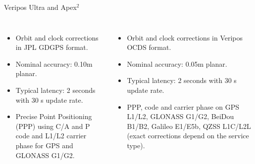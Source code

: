 \documentclass[11pt]{beamer}
\begin{document}
\begin{frame}{Veripos Ultra and Apex$^2$} %
	\begin{columns}[T,onlytextwidth]
		\begin{itemize}	
			\item Orbit and clock corrections in JPL GDGPS format.
			\item Nominal accuracy: 0.10m planar. 
			\item Typical latency: 2 seconds with 30 s update rate.%
			\item Precise Point Positioning (PPP) using C/A and P code and L1/L2 carrier phase for GPS and GLONASS G1/G2.
		\end{itemize}	
			\begin{itemize}
			\item Orbit and clock corrections in Veripos OCDS format.
			\item Nominal accuracy: 0.05m planar. 
			\item Typical latency: 2 seconds with 30 s update rate.%
			\item PPP, code and carrier phase on GPS L1/L2, GLONASS G1/G2, BeiDou B1/B2, Galileo E1/E5b, QZSS L1C/L2L (exact corrections depend on the service type).
			\end{itemize}	
	\end{columns}
\end{frame}
\end{document}
